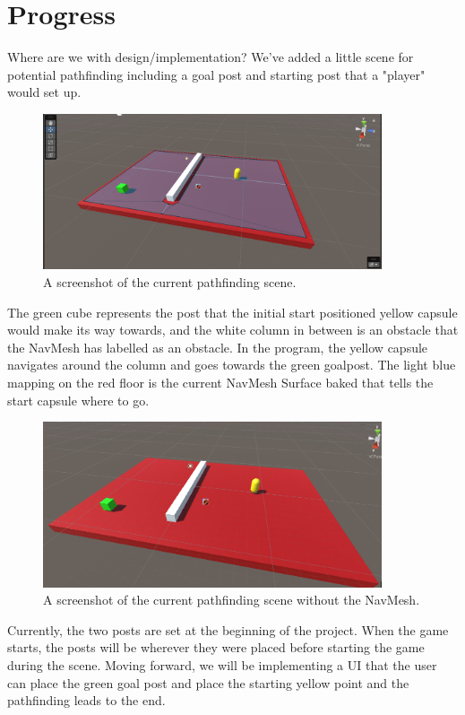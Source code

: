 \section{Progress}

Where are we with design/implementation?
We've added a little scene for potential pathfinding including a goal post and starting post that a "player" would set up. 

\begin{figure}[htb]
    \centering
    \includegraphics[width=10cm]{../Images/Update2/PathFind.png}
       \caption{A screenshot of the current pathfinding scene.}
           \label{Fig:PathfindingScene}
  \end{figure}

\begin{flushleft}
The green cube represents the post that the initial start positioned yellow capsule would make its way towards, and the white column in between is an obstacle that the NavMesh has labelled as an obstacle. In the program, the yellow capsule navigates around the column and goes towards the green goalpost. The light blue mapping on the red floor is the current NavMesh Surface baked that tells the start capsule where to go.
\end{flushleft}

\begin{figure}[htb]
    \centering
    \includegraphics[width=10cm]{../Images/Update2/NoNavMesh.png}
       \caption{A screenshot of the current pathfinding scene without the NavMesh.}
           \label{Fig:NoNavMesh}
 \end{figure}

\begin{flushleft}
Currently, the two posts are set at the beginning of the project. When the game starts, the posts will be wherever they were placed before starting the game during the scene. Moving forward, we will be implementing a UI that the user can place the green goal post and place the starting yellow point and the pathfinding leads to the end. 
\end{flushleft}

